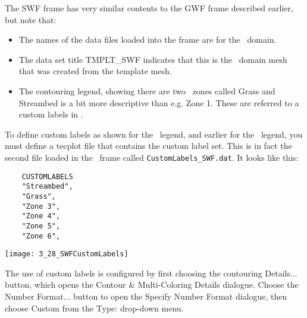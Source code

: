 The {\sf SWF} frame has very similar contents to the {\sf GWF} frame described earlier, but note that:
\begin{itemize}
  \item The names of the data files loaded into the frame are for the \swf\ domain.
  \item   The data set title {\sf TMPLT\_SWF} indicates that this is the \swf\ domain mesh that was created from the template mesh.
  \item The contouring legend, showing there are two \swf\ zones called {\sf Grass} and {\sf Streambed} is a bit more descriptive than e.g. {\sf Zone 1}.   These are referred to a custom labels in \tecplot.
\end{itemize}

 To define custom labels as shown for the \swf\ legend, and earlier for the \gwf\ legend, you must define a tecplot file that contains the custom label set.  This is in fact the second file loaded in the \swf\ frame called {\tt CustomLabels_SWF.dat}.  It looks like this:
\begin{verbatim}
    CUSTOMLABELS
    "Streambed",
    "Grass",
    "Zone 3",
    "Zone 4",
    "Zone 5",
    "Zone 6",
\end{verbatim}

        \texttt{[image: 3\_28\_SWFCustomLabels]}
        
The use of custom labels is configured by first choosing the contouring {\sf Details...} button, which opens the {\sf Contour & Multi-Coloring Details} dialogue.  Choose the {\sf Number Format...} button to open the {\sf Specify Number Format} dialogue, then choose {\sf Custom} from the {\sf Type:} drop-down menu. 
